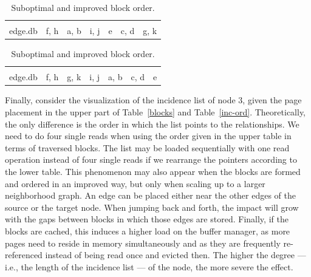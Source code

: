      \begin{table}[htp]
          \centering
    \begin{tabular}{|l | c | c | c | c | c | c|} \hline
    &&&&&&\\[-1em]
     edge.db &  \colorbox{green!30}{f}, \colorbox{green!30}{h}   & \colorbox{blue!30}{a}, \colorbox{blue!30}{b} & \colorbox{green!30}{i}, \colorbox{green!30}{j} & \colorbox{red!30}{e} & \colorbox{blue!30}{c}, \colorbox{blue!30}{d} & \colorbox{green!30}{g}, \colorbox{green!30}{k} \\ \hline
    \end{tabular}
    \vspace{0.5cm}
    
    \begin{tabular}{|l | c | c | c | c | c | c|}\hline
    &&&&&&\\[-1em]
     edge.db &  \colorbox{green!30}{f}, \colorbox{green!30}{h} & \colorbox{green!30}{g}, \colorbox{green!30}{k} & \colorbox{green!30}{i}, \colorbox{green!30}{j} & \colorbox{blue!30}{a}, \colorbox{blue!30}{b} & \colorbox{blue!30}{c}, \colorbox{blue!30}{d} & \colorbox{red!30}{e} \\ \hline
    \end{tabular}
      \caption{Suboptimal and improved block order.}
    \label{order}
       \end{table}
  
  Finally, consider the visualization of the incidence list of node 3, given the page placement in the upper part of Table~\ref{blocks} and Table~\ref{inc-ord}. 
  Theoretically, the only difference is the order in which the list points to the relationships. 
  We need to do four single reads when using the order given in the upper table in terms of traversed blocks. 
  The list may be loaded sequentially with one read operation instead of four single reads if we rearrange the pointers according to the lower table. 
  This phenomenon may also appear when the blocks are formed and ordered in an improved way, but only when scaling up to a larger neighborhood graph.
  An edge can be placed either near the other edges of the source or the target node.
When jumping back and forth, the impact will grow with the gaps between blocks in which those edges are stored.
  Finally, if the blocks are cached, this induces a higher load on the buffer manager, as more pages need to reside in memory simultaneously and as they are frequently re-referenced instead of being read once and evicted then.
  The higher the degree --- i.e., the length of the incidence list --- of the node, the more severe the effect.

